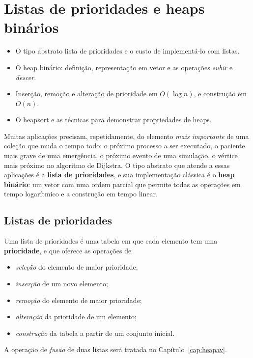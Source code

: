 \chapter{Listas de prioridades e heaps binários}\label{cap:heap}\label{sec:heap}
\begin{objetivos}
\begin{itemize}
  \item O tipo abstrato lista de prioridades e o custo de implementá-lo com listas.
  \item O heap binário: definição, representação em vetor e as operações \emph{subir} e \emph{descer}.
  \item Inserção, remoção e alteração de prioridade em $O(\log n)$, e construção em $O(n)$.
  \item O heapsort e as técnicas para demonstrar propriedades de heaps.
\end{itemize}
\end{objetivos}

Muitas aplicações precisam, repetidamente, do elemento \emph{mais importante} de uma coleção que muda o tempo todo: o próximo processo a ser executado, o paciente mais grave de uma emergência, o próximo evento de uma simulação, o vértice mais próximo no algoritmo de Dijkstra. O tipo abstrato que atende a essas aplicações é a \textbf{lista de prioridades}, e sua implementação clássica é o \textbf{heap binário}: um vetor com uma ordem parcial que permite todas as operações em tempo logarítmico e a construção em tempo linear.

\section{Listas de prioridades}\label{sec:listaprior}
Uma lista de prioridades é uma tabela em que cada elemento tem uma \textbf{prioridade}, e que oferece as operações de
\begin{itemize}
  \item \emph{seleção} do elemento de maior prioridade;
  \item \emph{inserção} de um novo elemento;
  \item \emph{remoção} do elemento de maior prioridade;
  \item \emph{alteração} da prioridade de um elemento;
  \item \emph{construção} da tabela a partir de um conjunto inicial.
\end{itemize}
A operação de \emph{fusão} de duas listas será tratada no Capítulo~\ref{cap:heapav}.

